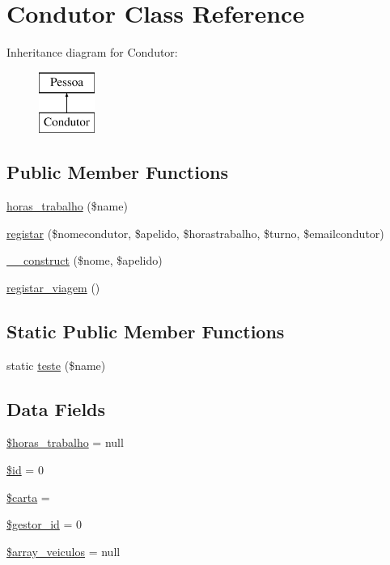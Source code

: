 \hypertarget{class_condutor}{}\section{Condutor Class Reference}
\label{class_condutor}
Inheritance diagram for Condutor\+:\begin{figure}[H]
\begin{center}
\leavevmode
\includegraphics[height=2.000000cm]{class_condutor}
\end{center}
\end{figure}
\subsection*{Public Member Functions}
\begin{DoxyCompactItemize}
\item 
\hyperlink{class_condutor_a9cbc868779d901c6d3239451a5697db8}{horas\+\_\+trabalho} (\$name)
\item 
\hyperlink{class_condutor_a1df5c296eaece77f0a6c358e85d7f709}{registar} (\$nomecondutor, \$apelido, \$horastrabalho, \$turno, \$emailcondutor)
\item 
\hyperlink{class_condutor_a7000384e0842c9caa71397ce3486d958}{\+\_\+\+\_\+construct} (\$nome, \$apelido)
\item 
\hyperlink{class_condutor_ae67a732e97ad3d6392c11ad6087d8821}{registar\+\_\+viagem} ()
\end{DoxyCompactItemize}
\subsection*{Static Public Member Functions}
\begin{DoxyCompactItemize}
\item 
static \hyperlink{class_condutor_a80e9de954abdf6d81abb71e6c16becf6}{teste} (\$name)
\end{DoxyCompactItemize}
\subsection*{Data Fields}
\begin{DoxyCompactItemize}
\item 
\hyperlink{class_condutor_aacf4107d2082c24e18c17ecdb542c16a}{\$horas\+\_\+trabalho} = null
\item 
\hyperlink{class_condutor_ae97941710d863131c700f069b109991e}{\$id} = 0
\item 
\hyperlink{class_condutor_a8f5c99b04198fc31f1fc4f65d25fdd0c}{\$carta} = \textquotesingle{}\textquotesingle{}
\item 
\hyperlink{class_condutor_a0a417a750596945da402317f18bc0d1c}{\$gestor\+\_\+id} = 0
\item 
\hyperlink{class_condutor_afcd8fb40c2185049004a461a31457d2b}{\$array\+\_\+veiculos} = null
\end{DoxyCompactItemize}



